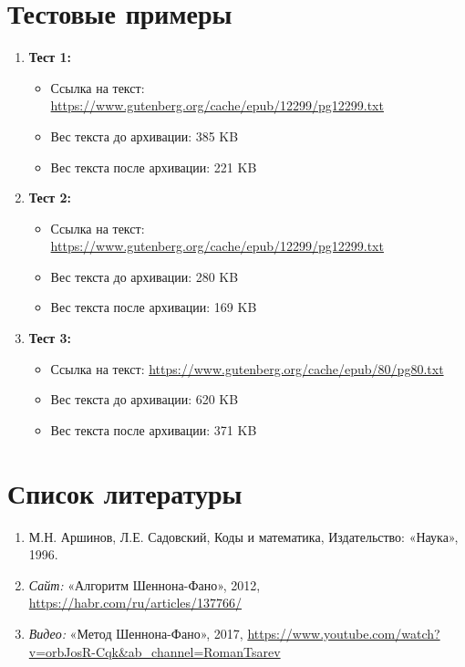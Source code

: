 \documentclass[a4paper,14pt]{article}
\begin{document}
\section{Тестовые примеры}
\begin{enumerate}
    \item \textbf{Тест 1:}
    \begin{itemize}
        \item Ссылка на текст: \url{https://www.gutenberg.org/cache/epub/12299/pg12299.txt}
        \item Вес текста до архивации: 385 KB
        \item Вес текста после архивации: 221 KB
    \end{itemize}
    \item \textbf{Тест 2:}
    \begin{itemize}
        \item Ссылка на текст: \url{https://www.gutenberg.org/cache/epub/12299/pg12299.txt}
        \item Вес текста до архивации: 280 KB
        \item Вес текста после архивации: 169 KB
    \end{itemize}
    \item \textbf{Тест 3:}
    \begin{itemize}
        \item Ссылка на текст: \url{https://www.gutenberg.org/cache/epub/80/pg80.txt}
        \item Вес текста до архивации: 620 KB
        \item Вес текста после архивации: 371 KB
    \end{itemize}
\end{enumerate}

\newpage
\section{Список литературы}
\begin{enumerate}
    \item М.Н. Аршинов, Л.Е. Садовский, Коды и математика, Издательство: «Наука», 1996.
    \item \textit{Сайт:} «Алгоритм Шеннона-Фано», 2012, \url{https://habr.com/ru/articles/137766/}
    \item \textit{Видео:} «Метод Шеннона-Фано», 2017, \url{https://www.youtube.com/watch?v=orbJosR-Cqk&ab_channel=RomanTsarev}
\end{enumerate}
\end{document}
